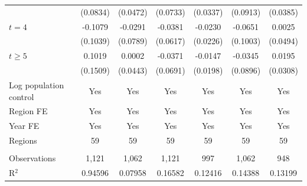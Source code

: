 \begin{tabular}{lcccccc}
                          & (0.0834)      & (0.0472)    & (0.0733)  & (0.0337)    & (0.0913)   & (0.0385)\\   
   $t = 4$                & -0.1079       & -0.0291     & -0.0381   & -0.0230     & -0.0651    & 0.0025\\   
                          & (0.1039)      & (0.0789)    & (0.0617)  & (0.0226)    & (0.1003)   & (0.0494)\\   
   $t \geq 5$             & 0.1019        & 0.0002      & -0.0371   & -0.0147     & -0.0345    & 0.0195\\   
                          & (0.1509)      & (0.0443)    & (0.0691)  & (0.0198)    & (0.0896)   & (0.0308)\\   
   Log population control & Yes           & Yes         & Yes       & Yes         & Yes        & Yes\\  
   Region FE              & Yes           & Yes         & Yes       & Yes         & Yes        & Yes\\  
   Year FE                & Yes           & Yes         & Yes       & Yes         & Yes        & Yes\\  
   Regions                & 59            & 59          & 59        & 59          & 59         & 59\\  
    \\
   Observations           & 1,121         & 1,062       & 1,121     & 997         & 1,062      & 948\\  
   R$^2$                  & 0.94596       & 0.07958     & 0.16582   & 0.12416     & 0.14388    & 0.13199\\  
   \bottomrule
\end{tabular}
\par\endgroup
